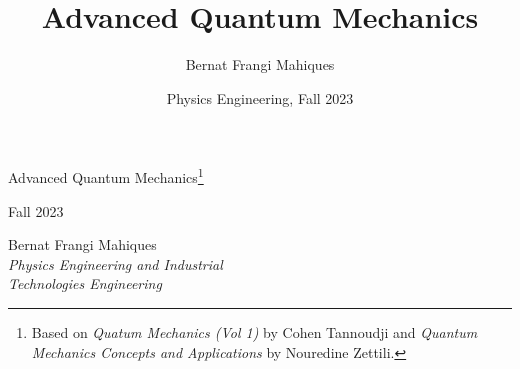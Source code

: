 \documentclass[a4paper,11pt,final]{article}
\title{Advanced Quantum Mechanics}
\date{Physics Engineering, Fall 2023}
\author{Bernat Frangi Mahiques}
\begin{document}
\begin{titlepage}
    \centering\Large\null\vfill

    {\Huge Advanced Quantum Mechanics\footnote{Based on \textit{Quatum Mechanics (Vol 1)} by Cohen Tannoudji and \textit{Quantum Mechanics Concepts and Applications} by Nouredine Zettili.}}\\ 
    \vspace{1em}

    Fall 2023\\
    \vskip8cm

    Bernat Frangi Mahiques\\

    \emph{Physics Engineering and Industrial\\Technologies Engineering}\\
    \vskip4cm
    \afterpage{\blankpage}
\end{titlepage}
\newpage
\pagestyle{plain}    
\tableofcontents
\newpage


\end{document}
